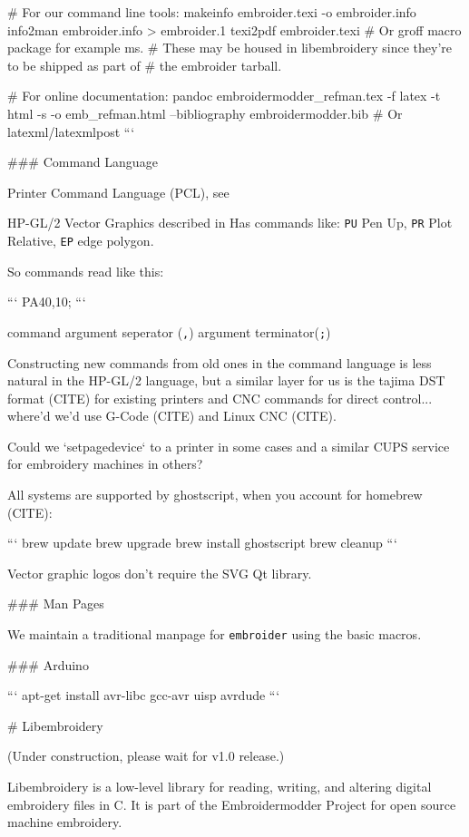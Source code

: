 # For our command line tools:
makeinfo embroider.texi -o embroider.info
info2man embroider.info > embroider.1
texi2pdf embroider.texi
# Or groff macro package for example ms.
# These may be housed in libembroidery since they're to be shipped as part of
# the embroider tarball.

# For online documentation:
pandoc embroidermodder_refman.tex -f latex -t html -s -o emb_refman.html --bibliography embroidermodder.bib
# Or latexml/latexmlpost
```

### Command Language

Printer Command Language (PCL), see %

HP-GL/2 Vector Graphics  described in %
Has commands like: \texttt{PU} Pen Up, \texttt{PR} Plot Relative,
\texttt{EP} edge polygon.

So commands read like this:

```
PA40,10;
```

command argument seperator (\texttt{,}) argument terminator(\texttt{;})

Constructing new commands from old ones in the command language is less
natural in the HP-GL/2 language, but a similar layer for us is
the tajima DST format (CITE) for existing printers and CNC commands for
direct control... where'd we'd use G-Code (CITE) and Linux CNC (CITE).

Could we `setpagedevice` to a printer in some cases and a similar CUPS service
for embroidery machines in others?

All systems are supported by ghostscript, when you account for homebrew (CITE):

```
brew update
brew upgrade
brew install ghostscript
brew cleanup
```

Vector graphic logos don't require the SVG Qt library.

### Man Pages

We maintain a traditional manpage for \texttt{embroider} using
the basic macros.

### Arduino

```
apt-get install avr-libc gcc-avr uisp avrdude
```

# Libembroidery

(Under construction, please wait for v1.0 release.)

Libembroidery is a low-level library for reading, writing,
and altering digital embroidery files in C. It is part of the Embroidermodder Project
for open source machine embroidery.

